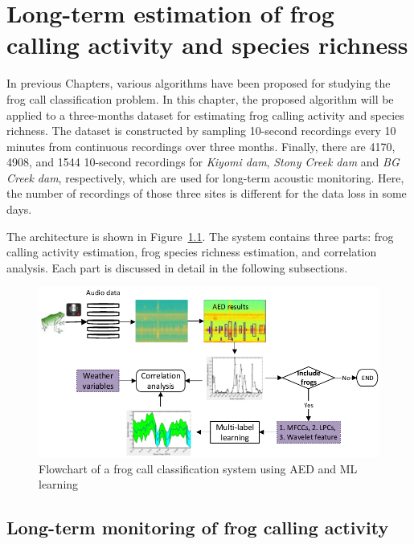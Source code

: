 
\chapter{Long-term estimation of frog calling activity and species richness}
\label{cha:cha8Application}

In previous Chapters, various algorithms have been proposed for studying the frog call classification problem. In this chapter, the proposed algorithm will be applied to a three-months dataset for estimating frog calling activity and species richness. The dataset is constructed by sampling 10-second recordings every 10 minutes from continuous recordings over three months. Finally, there are 4170, 4908, and 1544 10-second recordings for \textit{Kiyomi dam}, \textit{Stony Creek dam} and \textit{BG Creek dam}, respectively, which are used for long-term acoustic monitoring. Here, the number of recordings of those three sites is different for the data loss in some days.


The architecture is shown in Figure~\ref{fig:Ch7_flowchart}. The system contains three parts: frog calling activity estimation, frog species richness estimation, and correlation analysis. Each part is discussed in detail in the following subsections.

\begin{figure}[htb!]
\centering
\includegraphics[width=\textwidth]{image/Ch7/flowchart.pdf}
\caption{Flowchart of a frog call classification system using AED and ML learning}
\label{fig:Ch7_flowchart}
\end{figure}




\section{Long-term monitoring of frog calling activity}

